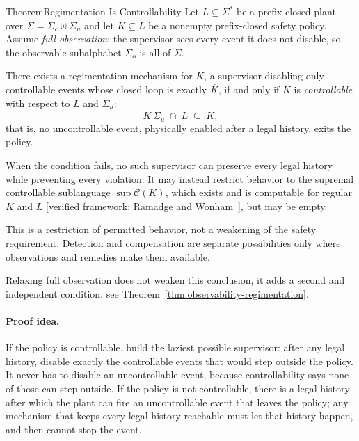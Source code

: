 \documentclass[11pt,a4paper]{article}
\theoremstyle{definition}
\theoremstyle{remark}
\begin{document}
\begin{pdclaim}{Theorem}{Regimentation Is Controllability}\label{thm:regimentation-controllability}
\setlength{\parskip}{4pt plus 1pt}
Let $L \subseteq \Sigma^{*}$ be a prefix-closed plant over $\Sigma = \Sigma_c \uplus \Sigma_u$
and let $K \subseteq L$ be a nonempty prefix-closed safety policy. Assume \emph{full
observation}: the supervisor sees every event it does not disable, so the observable
subalphabet $\Sigma_o$ is all of $\Sigma$.

There exists a
regimentation mechanism for $K$, a supervisor disabling only controllable events whose closed
loop is exactly $\overline{K}$, if and only if $K$ is \emph{controllable} with respect to $L$
and $\Sigma_u$:
\[
  \overline{K}\,\Sigma_u \;\cap\; \overline{L} \;\subseteq\; \overline{K},
\]
that is, no uncontrollable event, physically enabled after a legal history, exits the policy.

When the condition fails, no such supervisor can preserve every legal history
while preventing every violation. It may instead restrict behavior to the
supremal controllable sublanguage
$\sup\mathcal{C}(K)$, which exists and is computable for regular $K$ and $L$
[verified framework: Ramadge and Wonham~], but may be empty.

This is a restriction of permitted behavior, not a weakening of the safety
requirement. Detection and compensation are separate possibilities only where
observations and remedies make them available.

Relaxing full observation does not weaken this conclusion, it adds a second and independent
condition: see Theorem~\ref{thm:observability-regimentation}.
\end{pdclaim}

\paragraph{Proof idea.}
If the policy is controllable, build the laziest possible supervisor: after any legal
history, disable exactly the controllable events that would step outside the policy. It never
has to disable an uncontrollable event, because controllability says none of those can step
outside. If the policy is not controllable, there is a legal history after which the plant
can fire an uncontrollable event that leaves the policy; any mechanism that keeps every legal
history reachable must let that history happen, and then cannot stop the event.
\end{document}
